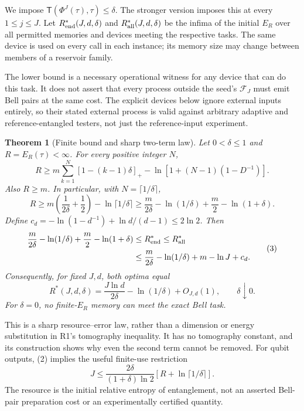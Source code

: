 \documentclass[11pt,a4paper]{article}
\newtheorem{theorem}{Theorem}
\newcommand{\ER}{E_R}
\newcommand{\dist}{\mathsf T}
\begin{document}
We impose \(\dist(\Phi^J(\tau),\tau)\le\delta\).
The stronger version imposes this at every \(1\le j\le J\).
Let \(R_{\rm end}^*(J,d,\delta)\) and \(R_{\rm all}^*(J,d,\delta)\)
be the infima of the initial \(\ER\) over all permitted memories and devices
meeting the respective tasks. The same device is used on every call in each
instance; its memory size may change between members of a reservoir family.

The lower bound is a necessary operational witness for any device that can do
this task. It does not assert that every process outside the seed's
\(\mathcal F_J\) must emit Bell pairs at the same cost.
The explicit devices below ignore external inputs entirely, so their stated
external process is valid against arbitrary adaptive and reference-entangled
testers, not just the reference-input experiment.

\begin{theorem}[Finite bound and sharp two-term law]\label{thm:main}
Let \(0<\delta\le1\) and \(R=\ER(\tau)<\infty\).
For every positive integer \(N\),
\[
 R\ge m\sum_{k=1}^N[1-(k-1)\delta]_+
       -\ln\!\left[1+(N-1)(1-D^{-1})\right].                \tag{1}
\]
Also \(R\ge m\). In particular, with \(N=\lceil1/\delta\rceil\),
\[
 R\ge m\left(\frac1{2\delta}+\frac12\right)
             -\ln\lceil1/\delta\rceil
 \ge \frac m{2\delta}-\ln(1/\delta)+\frac m2-\ln(1+\delta).
                                                               \tag{2}
\]
Define \(c_d=-\ln(1-d^{-1})+\ln d/(d-1)\le2\ln2\).
Then
\[
\begin{split}
 \frac m{2\delta}-\ln(1/\delta)+\frac m2-\ln(1+\delta)
 &\le R_{\rm end}^*\le R_{\rm all}^*\\
 &\le \frac m{2\delta}-\ln(1/\delta)+m-\ln J+c_d.
\end{split}\tag{3}
\]
Consequently, for fixed \(J,d\), both optima equal
\[
 \boxed{\quad
 R^*(J,d,\delta)=\frac{J\ln d}{2\delta}-\ln(1/\delta)
                       +O_{J,d}(1),\qquad \delta\downarrow0 .
 \quad}                                                    \tag{4}
\]
For \(\delta=0\), no finite-\(\ER\) memory can meet the exact Bell task.
\end{theorem}

This is a sharp resource--error law, rather than a dimension or energy
substitution in R1's tomography inequality. It has no tomography constant,
and its construction shows why even the second term cannot be removed.
For qubit outputs, (2) implies the useful finite-use restriction
\[
 J\le \frac{2\delta}{(1+\delta)\ln2}
                  \left[R+\ln\lceil1/\delta\rceil\right].    \tag{5}
\]
The resource is the initial relative entropy of entanglement, not an asserted
Bell-pair preparation cost or an experimentally certified quantity.
\end{document}
